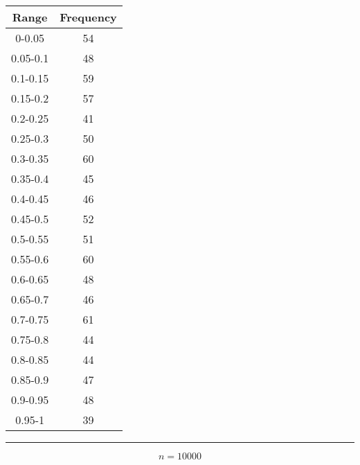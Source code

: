 \begin{center} \begin{tabular}{||c | c||}  \hline
Range & Frequency \\ [0.5ex] \hline \hline0-0.05 & 54\\
 \hline 
0.05-0.1 & 48\\
 \hline 
0.1-0.15 & 59\\
 \hline 
0.15-0.2 & 57\\
 \hline 
0.2-0.25 & 41\\
 \hline 
0.25-0.3 & 50\\
 \hline 
0.3-0.35 & 60\\
 \hline 
0.35-0.4 & 45\\
 \hline 
0.4-0.45 & 46\\
 \hline 
0.45-0.5 & 52\\
 \hline 
0.5-0.55 & 51\\
 \hline 
0.55-0.6 & 60\\
 \hline 
0.6-0.65 & 48\\
 \hline 
0.65-0.7 & 46\\
 \hline 
0.7-0.75 & 61\\
 \hline 
0.75-0.8 & 44\\
 \hline 
0.8-0.85 & 44\\
 \hline 
0.85-0.9 & 47\\
 \hline 
0.9-0.95 & 48\\
 \hline 
0.95-1 & 39\\
 \hline 
\end{tabular} 
 \end{center}

 \noindent\rule[0.5ex]{\linewidth}{1pt}



$$n= 10000$$

